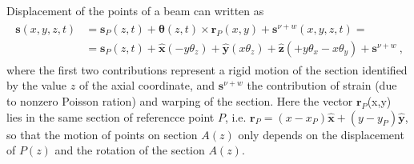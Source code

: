 \documentclass[letterpaper,10pt,english]{jupyterBook}
\begin{document}
\sphinxAtStartPar
{} Displacement of the points of a beam can written as
\begin{equation*}
\begin{split}\begin{aligned}
  \mathbf{s}(x,y,z,t)
  & = \mathbf{s}_P(z,t) + \boldsymbol{\theta}(z,t) \times \mathbf{r}_P(x,y) + \mathbf{s}^{\nu + w}(x,y,z,t) = \\ 
  & = \mathbf{s}_P(z,t) + \hat{\mathbf{x}} \left( - y \theta_z \right) + \hat{\mathbf{y}} \left( x \theta_z \right) + \hat{\mathbf{z}} \left( + y \theta_x - x \theta_y \right) + \mathbf{s}^{\nu + w} \ ,
\end{aligned}\end{split}
\end{equation*}
\sphinxAtStartPar
where the first two contributions represent a rigid motion of the section identified by the value \(z\) of the axial coordinate, and \(\mathbf{s}^{\nu + w}\) the contribution of strain (due to non\sphinxhyphen{}zero Poisson ration) and warping of the section. Here the vector \(\mathbf{r}_P\)(x,y) lies in the same section of referencce point \(P\), i.e. \(\mathbf{r}_P = (x-x_P) \hat{\mathbf{x}} + (y-y_P) \hat{\mathbf{y}}\), so that the motion of points on section \(A(z)\) only depends on the displacement of \(P(z)\) and the rotation of the section \(A(z)\).
\end{document}
